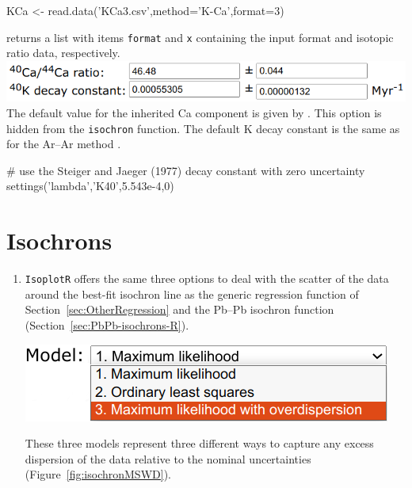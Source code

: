 \begin{refsection}
\begin{script}
KCa <- read.data('KCa3.csv',method='K-Ca',format=3)
\end{script}

\noindent returns a list with items \texttt{format} and \texttt{x}
containing the input format and isotopic ratio data, respectively.\\

\noindent\includegraphics[width=.7\linewidth]{../figures/KCaLambda.png}\\

\noindent The default value for the inherited Ca component is given by
\citet{moore1972}. This option is hidden from the \texttt{isochron}
function. The default K decay constant is the same as for the Ar--Ar
method \citep{renne2011}.

\begin{script}
# use the Steiger and Jaeger (1977) decay constant with zero uncertainty
settings('lambda','K40',5.543e-4,0)
\end{script}

\section{Isochrons}\label{sec:ArAr-isochrons-R}

\begin{enumerate}

\item \texttt{IsoplotR} offers the same three options to deal with the
  scatter of the data around the best-fit isochron line as the generic
  regression function of Section~\ref{sec:OtherRegression} and the
  Pb--Pb isochron function (Section~\ref{sec:PbPb-isochrons-R}).

\noindent\begin{minipage}[t]{.45\linewidth}
\strut\vspace*{-\baselineskip}\newline
\includegraphics[width=\linewidth]{../figures/ArArIsochronModels.png}
\end{minipage}
\begin{minipage}[t]{.55\linewidth}
  These three models represent three different ways to capture any
  excess dispersion of the data relative to the nominal uncertainties
  (Figure~\ref{fig:isochronMSWD}).
\end{minipage}


\end{enumerate}
\end{refsection}
